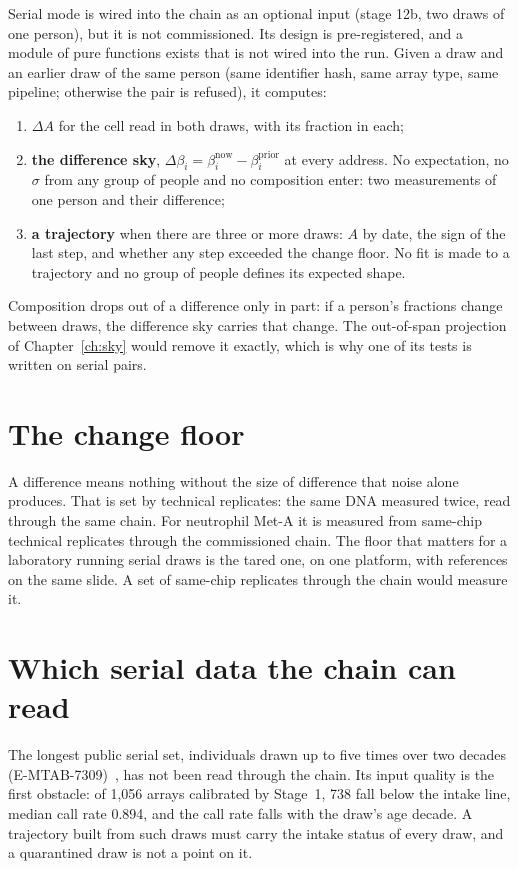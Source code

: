 Serial mode is wired into the chain as an optional input (stage 12b, two draws of one person), but it is not commissioned. \openprob{} Its design is pre-registered, and a module of
pure functions exists that is not wired into the run. Given a draw and an earlier draw of the same person (same
identifier hash, same array type, same pipeline; otherwise the pair is refused), it computes:
\begin{enumerate}
\item \textbf{$\Delta A$} for the cell read in both draws, with its fraction in each;
\item \textbf{the difference sky}, $\Delta\beta_i=\beta_i^{\mathrm{now}}-\beta_i^{\mathrm{prior}}$ at every address. No expectation, no $\sigma$ from any
      group of people and no composition enter: two measurements of one person and their difference;
\item \textbf{a trajectory} when there are three or more draws: $A$ by date, the sign of the last step, and whether any step exceeded the change floor.
      No fit is made to a trajectory and no group of people defines its expected shape.
\end{enumerate}
Composition drops out of a difference only in part: if a person's fractions change between draws, the difference sky carries that change. The
out-of-span projection of Chapter~\ref{ch:sky} would remove it exactly, which is why one of its tests is written on serial pairs.

\section{The change floor}

A difference means nothing without the size of difference that noise alone produces. That is set by technical replicates: the same DNA measured twice,
read through the same chain. For neutrophil Met-A it is measured from same-chip technical replicates through the commissioned chain. \openprob
The floor that matters for a laboratory running serial draws is the tared one, on one platform, with references on the same slide. A set of same-chip
replicates through the chain would measure it.

\section{Which serial data the chain can read}

The longest public serial set, individuals drawn up to five times over two decades (E-MTAB-7309)~\cite{Wang2018SATSA}, has not been read through the chain. Its input quality is the first obstacle: of 1,056 arrays calibrated by Stage~1, 738 fall below the intake line, median call rate 0.894,
and the call rate falls with the draw's age decade. \measured{} A trajectory built from such draws must carry the intake status of
every draw, and a quarantined draw is not a point on it. \openprob

